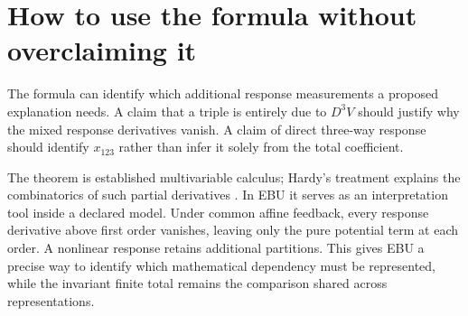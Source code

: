 \section{How to use the formula without overclaiming it}
The formula can identify which additional response measurements a proposed explanation needs. A claim that a triple is entirely due to $D^3V$ should justify why the mixed response derivatives vanish. A claim of direct three-way response should identify $x_{123}$ rather than infer it solely from the total coefficient.

The theorem is established multivariable calculus; Hardy's treatment explains the combinatorics of such partial derivatives \cite{hardy}. In EBU it serves as an interpretation tool inside a declared model. Under common affine feedback, every response derivative above first order vanishes, leaving only the pure potential term at each order. A nonlinear response retains additional partitions. This gives EBU a precise way to identify which mathematical dependency must be represented, while the invariant finite total remains the comparison shared across representations.
